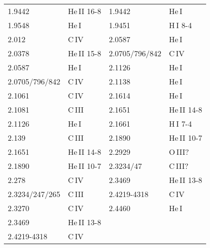 \documentclass[usenatbib]{mnras}%
\begin{document}
\begin{table}
\begin{tabular}{l l | l l }
\noalign{\smallskip}
 1.9442 & He\,II 16-8    & 1.9442  & He\,I\\
 1.9548 & He\,I          & 1.9451     & H\,I 8-4\\
 2.012  & C\,IV          & 2.0587     & He\,I\\
 2.0378 & He\,II 15-8    & 2.0705/796/842 & C\,IV\\
 2.0587 & He\,I          &   2.1126     & He\,I\\
 2.0705/796/842  & C\,IV & 2.1138     & He\,I\\
 2.1061 & C\,IV          & 2.1614     & He\,I\\
 2.1081 & C\,III         & 2.1651     & He\,II 14-8\\
 2.1126 & He\,I          & 2.1661     & H\,I 7-4\\
 2.139  & C\,III         & 2.1890     & He\,II 10-7\\
 2.1651 & He\,II 14-8    & 2.2929     & O\,III?\\
 2.1890 & He\,II 10-7    & 2.3234/47 & C\,III?\\
 2.278  & C\,IV          & 2.3469     & He\,II 13-8\\
 2.3234/247/265 & C\,III & 2.4219-4318 &  C\,IV\\
 2.3270 & C\,IV          & 2.4460     & He\,I\\
 2.3469 & He\,II 13-8\\
 2.4219-4318 & C\,IV \\
\hline                                   %
\end{tabular}
\end{table}
\end{document}
